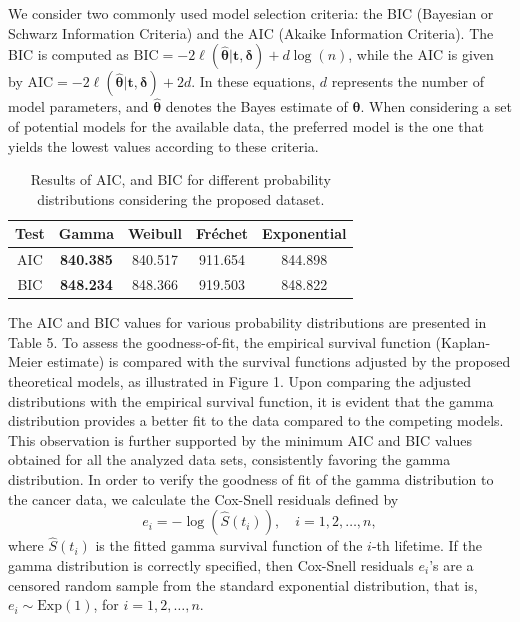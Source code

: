 \documentclass[]{interact}
\theoremstyle{plain}%
\theoremstyle{definition}
\theoremstyle{remark}
\begin{document}
We consider two commonly used model selection criteria: the BIC (Bayesian or Schwarz Information Criteria) and the AIC (Akaike Information Criteria). The BIC is computed as $\text{BIC} = -2 \ell(\hat{\boldsymbol{\theta}}|\boldsymbol{t,\delta}) + d\log(n)$, while the AIC is given by $\text{AIC} = -2 \ell(\hat{\boldsymbol{\theta}}|\boldsymbol{t,\delta}) + 2d$. In these equations, $d$ represents the number of model parameters, and $\hat{\boldsymbol{\theta}}$ denotes the Bayes estimate of $\boldsymbol{\theta}$. When considering a set of potential models for the available data, the preferred model is the one that yields the lowest values according to these criteria.

\begin{table}[!h]
\centering %
	\caption{Results of AIC, and BIC for different probability distributions considering the proposed dataset.}

	{\begin{tabular}{c|c|c|c|c}
			\hline
			Test   &  Gamma & Weibull & Fréchet & Exponential \\ \hline
			AIC    & \textbf{840.385} & 840.517 & 911.654 & 844.898 \\ 
			BIC    & \textbf{848.234} & 848.366 & 919.503 & 848.822  \\ \hline
		\end{tabular}}\label{discairplane}
\end{table}

The AIC and BIC values for various probability distributions are presented in Table 5. To assess the goodness-of-fit, the empirical survival function (Kaplan-Meier estimate) is compared with the survival functions adjusted by the proposed theoretical models, as illustrated in Figure 1. Upon comparing the adjusted distributions with the empirical survival function, it is evident that the gamma distribution provides a better fit to the data compared to the competing models. This observation is further supported by the minimum AIC and BIC values obtained for all the analyzed data sets, consistently favoring the gamma distribution. In order to verify the goodness of fit of the gamma distribution to the cancer data, we calculate the Cox-Snell residuals \citep{cox1968} defined by
\begin{equation*}
    e_i=-\log \left(\hat S(t_i)\right),\quad  i=1,2,\ldots,n,
\end{equation*}
where $\hat S(t_i)$ is the fitted gamma survival function of the $i$-th lifetime.  If the gamma distribution  is correctly specified, then Cox-Snell residuals $e_i$'s are a censored random sample from the standard exponential distribution, that is, $e_i\sim \text{Exp}(1)$, for $i=1,2,\ldots,n$.
\end{document}
